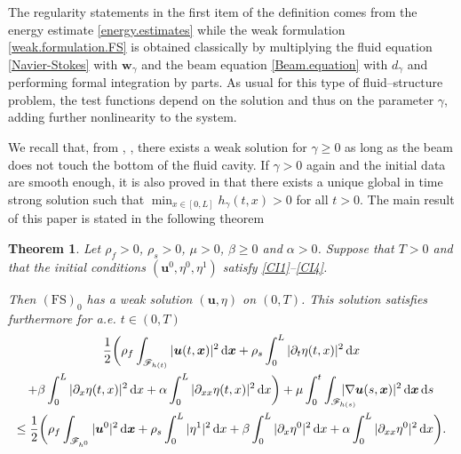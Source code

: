 \documentclass[10pt]{amsart}
\let\mathcal\mathscr
\newcommand{\FS}{\mathrm{FS}}
\newtheorem{theorem}{Theorem}
\theoremstyle{remark}
\theoremstyle{definition}
\newcommand{\ug}{\boldsymbol{u}}
\newcommand{\xg}{\boldsymbol{x}}
\newcommand{\dd}{\,\mathrm{d}}
\newcommand{\wg}{\boldsymbol{w}}
\begin{document}
The regularity statements in the first item of the definition comes from the energy estimate \eqref{energy.estimates} while
the weak formulation \eqref{weak.formulation.FS} is obtained classically by multiplying the fluid equation \eqref{Navier-Stokes}
with $\wg_{\gamma}$ and the beam equation \eqref{Beam.equation} with $d_{\gamma}$ and performing formal integration by parts. As usual for this type of fluid--structure problem, the test functions depend on the solution and thus on the parameter $\gamma$, adding further nonlinearity to the system.

We recall that, from \cite{Chambolle-etal}, \cite{Grandmont08}, there exists a weak solution for $\gamma \geq 0$ as long as the beam does not touch the bottom of the fluid cavity. If $\gamma >0$ again and the initial data are smooth enough, it is also proved in \cite{Grandmont-Hillairet} that there exists a unique global in time strong solution such that $\min_{x\in [0, L]}h_\gamma(t,x)>0$ for all $t>0$. 
The main result of this paper is stated in the following theorem


\begin{theorem}\label{main.theorem}
Let $\rho_{f}>0$, $\rho_{s}>0$, $\mu>0$, $\beta\geq 0$ and $\alpha>0$. Suppose that $T>0$ and that the initial conditions $(\ug^{0},\eta^{0},\eta^{1})$ satisfy \eqref{CI1}--\eqref{CI4}.

Then $(\FS)_0$ has a weak solution $(\ug,\eta)$ on $(0,T)$. This solution satisfies furthermore for a.e. $t \in (0,T)$
\begin{multline}\label{energy.estimates.thm}
\frac{1}{2}\biggl(\rho_{f}\int_{\mathcal{F}_{h(t)}}\vert\ug(t, \xg) \vert^{2} \dd\xg + \rho_{s}\int_{0}^{L}\vert\partial_{t}\eta(t, x) \vert^{2} \dd x\\
\shoveright{+\beta\int_{0}^{L}\vert\partial_{x}\eta(t, x) \vert^{2} \dd x+\alpha\int_{0}^{L}\vert\partial_{xx}\eta(t, x) \vert^{2} \dd x\biggr)
+ \mu\int_0^t\int_{\mathcal{F}_{h(s)}}\hspace*{-5mm}\vert \nabla\ug(s, \xg) \vert^{2} \dd\xg\dd s}\\
\leq \frac{1}{2}\biggl(\rho_{f}\int_{\mathcal{F}_{h^0}}\vert\ug^0\vert^{2} \dd \xg+ \rho_{s}\int_{0}^{L}\vert\eta^1\vert^{2}\dd x
+\beta\int_{0}^{L}\vert\partial_{x}\eta^0\vert^{2}\dd x+\alpha\int_{0}^{L}\vert\partial_{xx}\eta^0\vert^{2}\dd x\biggr).
\end{multline}
\end{theorem}
\end{document}
